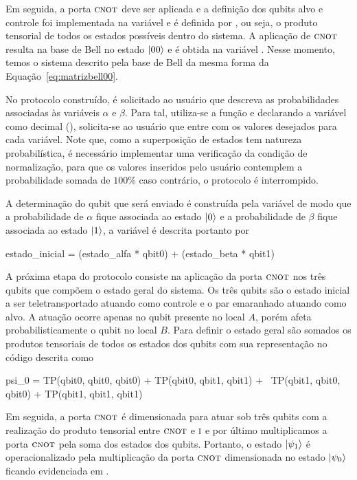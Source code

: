 Em seguida, a porta \(\operatorname{\textsc{cnot}}\) deve ser aplicada e a definição dos qubits alvo e controle foi implementada na variável  e é definida por , ou seja, o produto tensorial de todos os estados possíveis dentro do sistema. A aplicação de \(\operatorname{\textsc{cnot}}\) resulta na base de Bell no estado $\ket{00}$ e é obtida na variável . Nesse momento, temos o sistema descrito pela base de Bell da mesma forma da Equação~\eqref{eq:matrizbell00}.


No protocolo construído, é solicitado ao usuário que descreva as probabilidades associadas às variáveis $\alpha$ e $\beta$. Para tal, utiliza-se a função  e declarando a variável como decimal (), solicita-se ao usuário que entre com os valores desejados para cada variável. Note que, como a superposição de estados tem natureza probabilística, é necessário implementar uma verificação da condição de normalização, para que os valores inseridos pelo usuário contemplem a probabilidade somada de $100\%$ caso contrário, o protocolo é interrompido.

A determinação do qubit que será enviado é construída pela variável  de modo que a probabilidade de $\alpha$ fique associada ao estado $\ket{0}$ e a probabilidade de $\beta$ fique associada ao estado $\ket{1}$, a variável é descrita portanto por
\begin{pycode}
  estado_inicial = (estado_alfa * qbit0) + (estado_beta * qbit1)
\end{pycode}

A próxima etapa do protocolo consiste na aplicação da porta \(\operatorname{\textsc{cnot}}\) nos três qubits que compõem o estado geral do sistema. Os três qubits são o estado inicial a ser teletransportado atuando como controle e o par emaranhado atuando como alvo. A atuação ocorre apenas no qubit presente no local \(A\), porém afeta probabilisticamente o qubit no local \(B\). Para definir o estado geral são somados os produtos tensoriais de todos os estados dos qubits com sua representação no código descrita como
\begin{pycode}
  psi_0 = TP(qbit0, qbit0, qbit0) + TP(qbit0, qbit1, qbit1) + \
          TP(qbit1, qbit0, qbit0) + TP(qbit1, qbit1, qbit1)
\end{pycode}
Em seguida, a porta \(\operatorname{\textsc{cnot}}\) é dimensionada para atuar sob três qubits com a realização do produto tensorial entre \(\operatorname{\textsc{cnot}}\) e \(\operatorname{\textsc{i}}\) e por último multiplicamos a porta \(\operatorname{\textsc{cnot}}\) pela soma dos estados dos qubits. Portanto, o estado $\ket{\psi_1}$ é operacionalizado pela multiplicação da porta \(\operatorname{\textsc{cnot}}\) dimensionada no estado $\ket{\psi_0}$ ficando evidenciada em .

